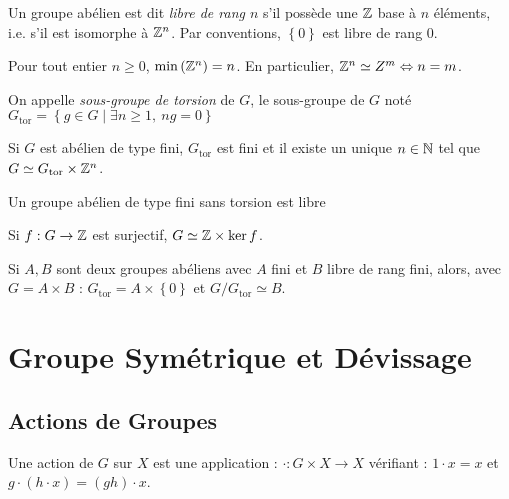 \documentclass{cours}
\begin{document}
\begin{definition}
    Un groupe abélien est dit \emph{libre de rang $n$} s'il possède une $\mathbb{Z}$ base à $n$ éléments, i.e. s'il est isomorphe à $\mathbb{Z}^{n}$. Par conventions, $\left\{0\right\}$ est libre de rang $0$.
\end{definition}

\begin{lemma}
    Pour tout entier $n\geq 0$, $\min{\left(\mathbb{Z}^{n}\right)} = n$. En particulier, $\mathbb{Z}^{n} \simeq Z^{m} \Leftrightarrow n = m$.
\end{lemma}

\begin{definition}
    On appelle \emph{sous-groupe de torsion} de $G$, le sous-groupe de $G$ noté $G_{\text{tor}} =\left\{g \in G \mid \exists n \geq 1, \ ng = 0\right\}$
\end{definition}
 
\begin{theorem}[Dirichlet]
    Si $G$ est abélien de type fini, $G_{\text{tor}}$ est fini et il existe un unique $n \in \mathbb{N}$ tel que $G \simeq G_{\text{tor}} \times \mathbb{Z}^{n}$.
\end{theorem}

\begin{corollary}
    Un groupe abélien de type fini sans torsion est libre
\end{corollary}

\begin{lemma}
    Si $f:  G \rightarrow \mathbb{Z}$ est surjectif, $G \simeq \mathbb{Z} \times \ker f$.
\end{lemma}

\begin{lemma}
    Si $A, B$ sont deux groupes abéliens avec $A$ fini et $B$ libre de rang fini, alors, avec $G = A\times B$ : $G_{\text{tor}} = A \times \left\{0\right\}$ et $G/G_{\text{tor}} \simeq B$.
\end{lemma}

\newpage
\section{Groupe Symétrique et Dévissage}
\subsection{Actions de Groupes}
\begin{definition}
    Une action de $G$ sur $X$ est une application : 
    $\cdot : G \times X \rightarrow X$ vérifiant : 
    $ 1\cdot x = x$ et $g \cdot \left(h \cdot x\right) = (gh) \cdot x$.
\end{definition}
\end{document}
